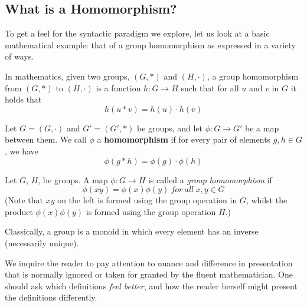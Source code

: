 \subsection{What is a Homomorphism?} \label{homo}

To get a feel for the syntactic paradigm we explore, let us look at a basic
mathematical example: that of a group homomorphism as expressed in a variety
of ways.


\begin{definition}
In mathematics, given two groups, $(G, \ast)$ and $(H, \cdot)$, a group homomorphism from $(G, \ast)$ to $(H, \cdot)$ is a function $h : G \to H$ such that for all $u$ and $v$ in $G$ it holds that
  $$h(u \ast v) = h ( u ) \cdot h ( v )$$ 
\end{definition}


\begin{definition}
Let $G = (G,\cdot)$ and $G' = (G',\ast)$ be groups, and let $\phi : G \to G'$ be a map between them. We call $\phi$ a \textbf{homomorphism} if for every pair of elements $g, h \in G$, we have 
  $$\phi(g \ast h) = \phi ( g ) \cdot \phi ( h )$$ 
\end{definition}


\begin{definition}\label{def:def3}
Let $G$, $H$, be groups.  A map $\phi : G \to H$ is called a \emph{group homomorphism} if
  $$\phi(xy) = \phi ( x ) \phi ( y )\ for\ all\ x, y \in G$$ 
(Note that $xy$ on the left is formed using the group operation in $G$, whilst the product $\phi ( x ) \phi ( y )$ is formed using the group operation $H$.)
\end{definition}


\begin{definition}\label{def:def4}
Classically, a group is a monoid in which every element has an inverse (necessarily unique).
\end{definition}

We inquire the reader to pay attention to nuance and difference in presentation
that is normally ignored or taken for granted by the fluent mathematician. One
should ask which definitions \emph{feel better}, and how the reader herself might
present the definitions differently.

